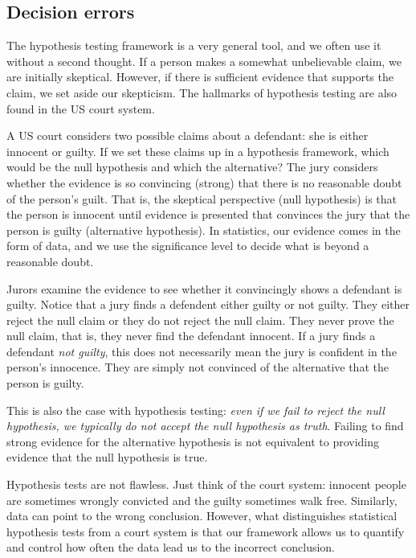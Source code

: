 \subsection{Decision errors}
The hypothesis testing framework is a very general tool, and we often use it without a second thought. If a person makes a somewhat unbelievable claim, we are initially skeptical. However, if there is sufficient evidence that supports the claim, we set aside our skepticism. The hallmarks of hypothesis testing are also found in the US court system. 

\begin{example}{A US court considers two possible claims about a defendant: she is either innocent or guilty. If we set these claims up in a hypothesis framework, which would be the null hypothesis and which the alternative?}\label{hypTestCourtExample}
The jury considers whether the evidence is so convincing (strong) that there is no reasonable doubt of the person's guilt. That is, the skeptical perspective (null hypothesis) is that the person is innocent until evidence is presented that convinces the jury that the person is guilty (alternative hypothesis). In statistics, our evidence comes in the form of data, and we use the significance level to decide what is beyond a reasonable doubt.
\end{example}

Jurors examine the evidence to see whether it convincingly shows a defendant is guilty. Notice that a jury finds a defendent either guilty or not guilty. They either reject the null claim or they do not reject the null claim. They never prove the null claim, that is, they never find the defendant innocent. If a jury finds a defendant \emph{not guilty}, this does not necessarily mean the jury is confident in the person's innocence. They are simply not convinced of the alternative that the person is guilty.

This is also the case with hypothesis testing: \emph{even if we fail to reject the null hypothesis, we typically do not accept the null hypothesis as truth}. Failing to find strong evidence for the alternative hypothesis is not equivalent to providing evidence that the null hypothesis is true.


Hypothesis tests are not flawless. Just think of the court system: innocent people are sometimes wrongly convicted and the guilty sometimes walk free. Similarly, data can point to the wrong conclusion. However, what distinguishes statistical hypothesis tests from a court system is that our framework allows us to quantify and control how often the data lead us to the incorrect conclusion.

